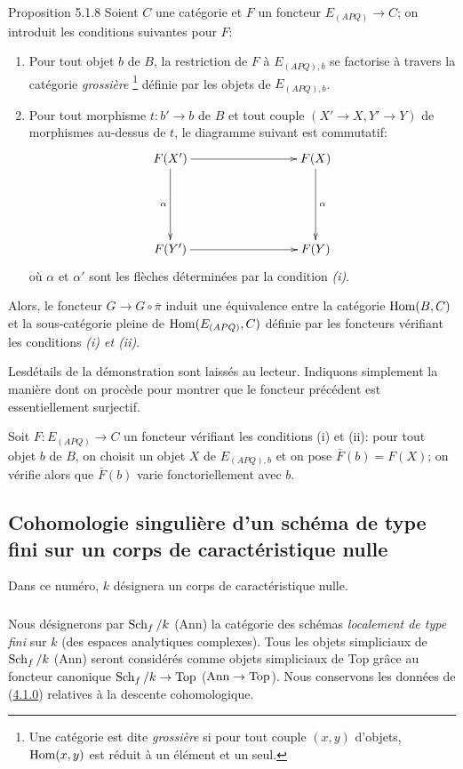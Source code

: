 \documentclass[10pt]{../fichiers-configuration-latex/smfart}
\begin{document}
\begin{enonce*}{Proposition 5.1.8}
Soient $C$ une catégorie et $F$ un foncteur $E_{(APQ)} \to C$; on
introduit les conditions suivantes pour $F$:
\begin{enumerate}
\renewcommand{\theenumi}{\roman{enumi}}
\renewcommand{\labelenumi}{(\theenumi)}
\item Pour tout objet $b$ de $B$, la restriction de $F$ à $E_{(APQ), b}$ se
  factorise à travers la catégorie \emph{grossière} \footnote{Une catégorie
  est dite \emph{grossière} si pour tout couple $(x, y)$ d'objets,
  $\operatorname{Hom}(x, y)$ est réduit à un élément et un seul.} définie par les
  objets de $E_{(APQ), b}$.

\item Pour tout morphisme $t : b'\to b$ de $B$ et tout couple $(X'\to
  X, Y'\to Y)$ de morphismes au-dessus de $t$, le diagramme suivant
  est commutatif:
\[
\xymatrix@C=3cm@R=2cm{
F(X')         \ar[r]  \ar[d]_{\alpha}& F(X)\ar[d]^{\alpha}\\
F(Y')          \ar[r] & F(Y)
}
\]
où $\alpha$ et ${\alpha}'$ sont les flèches déterminées par la
condition \emph{(i)}.
\end{enumerate}

Alors, le foncteur $G \to G \circ \bar{\pi}$ induit une équivalence
entre la catégorie $\operatorname{Hom}(B, C)$ et la sous-catégorie pleine de
$\operatorname{Hom}(E_{(APQ)}, C)$ définie par les foncteurs vérifiant les
conditions \emph{(i) et (ii)}.
\end{enonce*}

Les\pageoriginale détails de la démonstration sont laissés au
lecteur. Indiquons simplement la manière dont on procède pour montrer que le foncteur
précédent est essentiellement surjectif.

Soit $F : E_{(APQ)} \to C$ un foncteur vérifiant les conditions (i) et
(ii): pour tout objet $b$ de $B$, on choisit un objet $X$ de
$E_{(APQ), b}$ et on pose $\bar{F}(b) = F(X)$; on vérifie alors que
$\bar{F}(b)$ varie fonctoriellement avec $b$.

\subsection{Cohomologie singulière d'un schéma de type fini sur un
  corps de caractéristique nulle}

Dans ce numéro, $k$ désignera un corps de caractéristique nulle.

\setcounter{subsubsection}{-1}
\subsubsection{}
Nous désignerons par $\operatorname{Sch}_f /k$ (\resp Ann) la catégorie des schémas
\emph{localement de type fini} sur $k$ (\resp des espaces analytiques
complexes). Tous les objets simpliciaux de $\operatorname{Sch}_f /k$ (\resp Ann)
seront considérés comme objets simpliciaux de Top grâce au foncteur
canonique $\Sch_f /k \to  \Top$ (\resp $\Ann \to \Top$). Nous conservons
les données de (\hyperref[Vbis.subsubsec4.1.0]{4.1.0}) relatives à la descente cohomologique.
\end{document}
